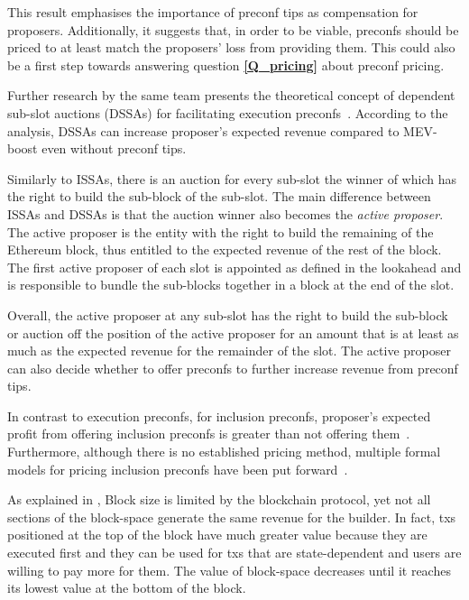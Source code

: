 \documentclass[a4paper]{article}
\theoremstyle{boldstyle}
\begin{document}
    This result emphasises the importance of preconf tips as compensation for proposers. Additionally, it suggests that, in order to be viable, preconfs should be priced to at least match the proposers' loss from providing them. This could also be a first step towards answering question \textbf{\ref{Q_pricing}} about preconf pricing.
    
    Further research by the same team presents the theoretical concept of dependent sub-slot auctions (DSSAs) for facilitating execution preconfs~\cite{W:AnalysingExpectedProposerRevenuefromPreconfirmations}. According to the analysis, DSSAs can increase proposer's expected revenue compared to MEV-boost even without preconf tips.

    Similarly to ISSAs, there is an auction for every sub-slot the winner of which has the right to build the sub-block of the sub-slot. The main difference between ISSAs and DSSAs is that the auction winner also becomes the \textit{active proposer}. The active proposer is the entity with the right to build the remaining of the Ethereum block, thus entitled to the expected revenue of the rest of the block. The first active proposer of each slot is appointed as defined in the lookahead and is responsible to bundle the sub-blocks together in a block at the end of the slot.

    Overall, the active proposer at any sub-slot has the right to build the sub-block or auction off the position of the active proposer for an amount that is at least as much as the expected revenue for the remainder of the slot. The active proposer can also decide whether to offer preconfs to further increase revenue from preconf tips.

    In contrast to execution preconfs, for inclusion preconfs, proposer's expected profit from offering inclusion preconfs is greater than not offering them~\cite{W:AnalysingExpectedProposerRevenuefromPreconfirmations}. Furthermore, although there is no established pricing method, multiple formal models for pricing inclusion preconfs have been put forward~\cite{W:APricingModelforInclusionPreconfirmations,W:PricingTransactionsforPreconfirmation}.

    As explained in \cite{W:APricingModelforInclusionPreconfirmations}, Block size is limited by the blockchain protocol, yet not all sections of the block-space generate the same revenue for the builder. In fact, txs positioned at the top of the block have much greater value because they are executed first and they can be used for txs that are state-dependent and users are willing to pay more for them. The value of block-space decreases until it reaches its lowest value at the bottom of the block.
    
\end{document}
